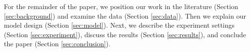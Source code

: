 \documentclass[11pt,a4paper]{article}
\begin{document}
For the remainder of the paper, we position our work in the literature (Section \ref{sec:background}) and examine the data (Section \ref{sec:data}). Then we  explain our model design (Section \ref{sec:model}). Next, we describe the experiment settings (Section \ref{sec:experiment}), discuss the results (Section \ref{sec:results}), and conclude the paper (Section \ref{sec:conclusion}).  

\end{document}
